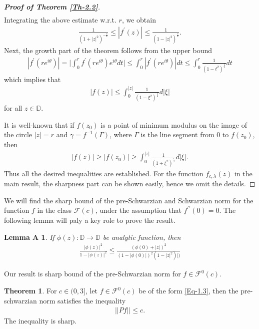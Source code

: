 \documentclass[a4paper,12pt]{amsart}
\theoremstyle{plain}
\theoremstyle{definition}
\newtheorem{thm}{Theorem}[section]
\theoremstyle{plain}
\newtheorem*{lemA}{Lemma A}
\newcounter {own}
\begin{document}
\begin{proof}[\bf Proof of Theorem \ref{Th-2.2}]
\begin{align*}
	\end{align*}
	Integrating the above estimate w.r.t. $r$, we obtain
	\begin{align*}
		\frac{1}{(1+|z|^2)^{-\frac{c}{2}}}\leq|f^{\prime}(z)|\leq\frac{1}{(1-|z|^2)^\frac{c}{2}}.
	\end{align*}
	Next, the growth part of the theorem follows from the upper bound
	\begin{align*}
		|f^{\prime}(re^{i\theta})|=\bigg|\int_{0}^{r}f^{\prime}(re^{i\theta})e^{i\theta} dt\bigg|\leq\int_{0}^{r}|f^{\prime}(re^{i\theta})| dt\leq\int_{0}^{r}\frac{1}{(1-t^2)^\frac{c}{2}} dt
	\end{align*}
	which implies that
	\begin{align*}
		|f(z)|\leq\int_{0}^{|z|}\frac{1}{(1-\xi^2)^\frac{c}{2}} d|\xi|
	\end{align*}
	for all $z\in\mathbb{D}$.\vspace{2mm} 
	
	It is well-known that if $f(z_0)$ is a point of minimum modulus on the image of the circle $|z|=r$ and $\gamma=f^{-1}(\Gamma)$, where $\Gamma$ is the line segment from $0$ to $f(z_0)$, then 
	\begin{align*}
		|f(z)|\geq	|f(z_0)|\geq\int_{0}^{|z|}\frac{1}{(1+\xi^2)^\frac{c}{2}} d|\xi|.
	\end{align*}
	Thus all the desired inequalities are established. For the function \( f_{c, \lambda}(z) \) in the main result, the sharpness part can be shown easily, hence we omit the details.
\end{proof}
We will find the sharp bound of the pre-Schwarzian and Schwarzian norm for the function $f$ in the class $\mathcal{F}(c)$, under the assumption  that $f^{\prime\prime}(0)=0$. The following lemma will paly a key role to prove the result.
\begin{lemA}\cite{Carrasco-Hernández-AMP-2023}\label{LemA}
	If $\phi(z):\mathbb{D}\rightarrow\mathbb{D}$ be analytic function, then 
	\begin{align*}
		\frac{|\phi(z)|^2}{1-|\phi(z)|^2}\leq\frac{(\phi(0)+|z|)^2}{(1-|\phi(0)|)^2(1-|z|^2)|)}
	\end{align*}
\end{lemA}
Our result is sharp bound of the pre-Schwarzian norm for $f\in\mathcal{F}^0(c)$.
\begin{thm}\label{Th-2.3}
	For $c\in(0,3]$, let $f\in\mathcal{F}^0(c)$ be of the form \eqref{Eq-1.3}, then the pre-schwarzian norm satisfies the inequality
	\begin{align*}
		||Pf||\leq c.
	\end{align*}
	The inequality is sharp.
\end{thm}
\end{document}

